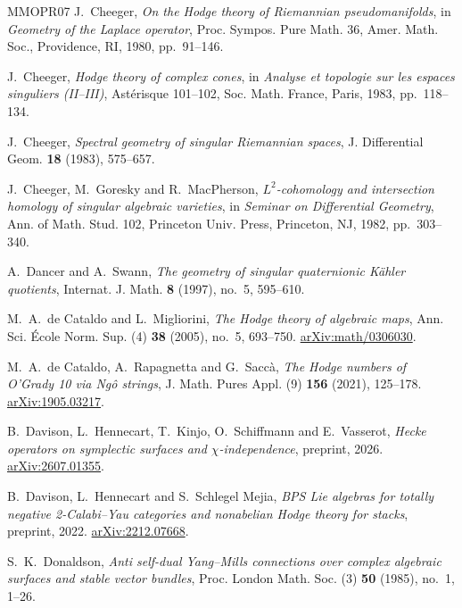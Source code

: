 \begin{thebibliography}{MMOPR07}
J.~Cheeger, \emph{On the Hodge theory of Riemannian pseudomanifolds},
in \emph{Geometry of the Laplace operator}, Proc. Sympos. Pure Math.
36, Amer. Math. Soc., Providence, RI, 1980, pp.~91--146.

J.~Cheeger, \emph{Hodge theory of complex cones}, in \emph{Analyse et
topologie sur les espaces singuliers (II--III)}, Ast\'erisque
101--102, Soc. Math. France, Paris, 1983, pp.~118--134.

J.~Cheeger, \emph{Spectral geometry of singular Riemannian spaces},
J. Differential Geom. \textbf{18} (1983), 575--657.

J.~Cheeger, M.~Goresky and R.~MacPherson,
\emph{$L^2$-cohomology and intersection homology of singular algebraic
varieties}, in \emph{Seminar on Differential Geometry}, Ann. of Math.
Stud. 102, Princeton Univ. Press, Princeton, NJ, 1982, pp.~303--340.

A.~Dancer and A.~Swann,
\emph{The geometry of singular quaternionic K\"ahler quotients},
Internat. J. Math. \textbf{8} (1997), no.~5, 595--610.

M.~A.~de Cataldo and L.~Migliorini,
\emph{The Hodge theory of algebraic maps},
Ann. Sci. \'Ecole Norm. Sup. (4) \textbf{38} (2005), no.~5, 693--750.
\href{https://arxiv.org/abs/math/0306030}{arXiv:math/0306030}.

M.~A.~de Cataldo, A.~Rapagnetta and G.~Sacc\`a,
\emph{The Hodge numbers of O'Grady 10 via Ng\^o strings},
J. Math. Pures Appl. (9) \textbf{156} (2021), 125--178.
\href{https://arxiv.org/abs/1905.03217}{arXiv:1905.03217}.

B.~Davison, L.~Hennecart, T.~Kinjo, O.~Schiffmann and E.~Vasserot,
\emph{Hecke operators on symplectic surfaces and $\chi$-independence},
preprint, 2026.
\href{https://arxiv.org/abs/2607.01355}{arXiv:2607.01355}.

B.~Davison, L.~Hennecart and S.~Schlegel Mejia,
\emph{BPS Lie algebras for totally negative 2-Calabi--Yau categories
and nonabelian Hodge theory for stacks}, preprint, 2022.
\href{https://arxiv.org/abs/2212.07668}{arXiv:2212.07668}.

S.~K.~Donaldson, \emph{Anti self-dual Yang--Mills connections over
complex algebraic surfaces and stable vector bundles},
Proc. London Math. Soc. (3) \textbf{50} (1985), no.~1, 1--26.


\end{thebibliography}
